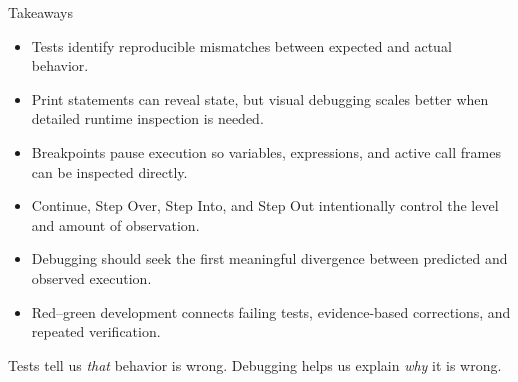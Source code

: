 \documentclass[aspectratio=169,10pt]{beamer}
\begin{document}
\begin{frame}{Takeaways}
  \begin{itemize}
    \item Tests identify reproducible mismatches between expected and actual behavior.
    \item Print statements can reveal state, but visual debugging scales better when detailed runtime inspection is needed.
    \item Breakpoints pause execution so variables, expressions, and active call frames can be inspected directly.
    \item Continue, Step Over, Step Into, and Step Out intentionally control the level and amount of observation.
    \item Debugging should seek the first meaningful divergence between predicted and observed execution.
    \item Red--green development connects failing tests, evidence-based corrections, and repeated verification.
  \end{itemize}

  \begin{keyidea}
    Tests tell us \emph{that} behavior is wrong. Debugging helps us explain \emph{why} it is wrong.
  \end{keyidea}
\end{frame}
\end{document}
